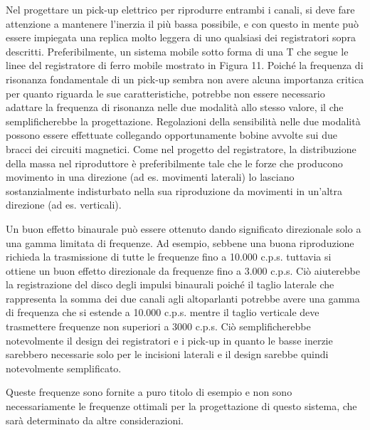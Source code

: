\documentclass[11pt]{article}
\begin{document}
\begin{multicols*}{2}
Nel progettare un pick-up elettrico per riprodurre entrambi i canali, si deve fare attenzione a mantenere l'inerzia il più bassa possibile, e con questo in mente può essere impiegata una replica molto leggera di uno qualsiasi dei registratori sopra descritti. Preferibilmente, un sistema mobile sotto forma di una T che segue le linee del registratore di ferro mobile mostrato in Figura 11. Poiché la frequenza di risonanza fondamentale di un pick-up sembra non avere alcuna importanza critica per quanto riguarda le sue caratteristiche, potrebbe non essere necessario adattare la frequenza di risonanza nelle due modalità allo stesso valore, il che semplificherebbe la progettazione. Regolazioni della sensibilità nelle due modalità possono essere effettuate collegando opportunamente bobine avvolte sui due bracci dei circuiti magnetici. Come nel progetto del registratore, la distribuzione della massa nel riproduttore è preferibilmente tale che le forze che producono movimento in una direzione (ad es. movimenti laterali) lo lasciano sostanzialmente indisturbato nella sua riproduzione da movimenti in un'altra direzione (ad es. verticali).

Un buon effetto binaurale può essere ottenuto dando significato direzionale solo a una gamma limitata di frequenze. Ad esempio, sebbene una buona riproduzione richieda la trasmissione di tutte le frequenze fino a 10.000 c.p.s. tuttavia si ottiene un buon effetto direzionale da frequenze fino a 3.000 c.p.s. Ciò aiuterebbe la registrazione del disco degli impulsi binaurali poiché il taglio laterale che rappresenta la somma dei due canali agli altoparlanti potrebbe avere una gamma di frequenza che si estende a 10.000 c.p.s. mentre il taglio verticale deve trasmettere frequenze non superiori a 3000 c.p.s. Ciò semplificherebbe notevolmente il design dei registratori e i pick-up in quanto le basse inerzie sarebbero necessarie solo per le incisioni laterali e il design sarebbe quindi notevolmente semplificato.

Queste frequenze sono fornite a puro titolo di esempio e non sono necessariamente le frequenze ottimali per la progettazione di questo sistema, che sarà determinato da altre considerazioni.


\end{multicols*}
\end{document}
